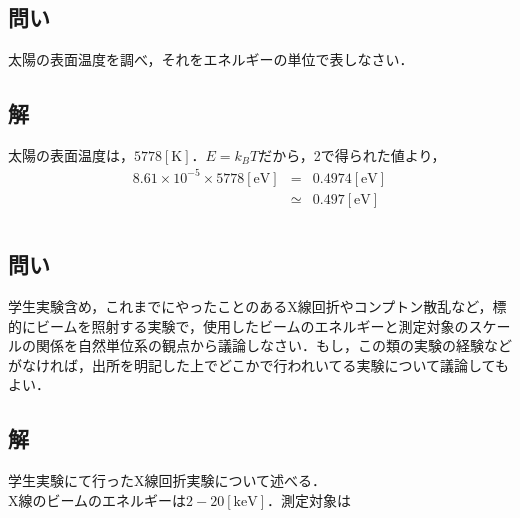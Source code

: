 \documentclass[10pt]{ujarticle}
\begin{document}
\section{}
\subsection{問い}
太陽の表面温度を調べ，それをエネルギーの単位で表しなさい．

\subsection{解}
太陽の表面温度は，$5778\mathrm{[K]}$．$E = k_B T$だから，2で得られた値より，
\begin{eqnarray*}
8.61 \times 10^{-5} \times 5778 \mathrm{[eV]} &=& 0.4974 \mathrm{[eV]} \\
&\simeq& 0.497 \mathrm{[eV]}
\end{eqnarray*}

\section{}
\subsection{問い}
学生実験含め，これまでにやったことのあるX線回折やコンプトン散乱など，標的にビームを照射する実験で，使用したビームのエネルギーと測定対象のスケールの関係を自然単位系の観点から議論しなさい．もし，この類の実験の経験などがなければ，出所を明記した上でどこかで行われいてる実験について議論してもよい．

\subsection{解}
学生実験にて行ったX線回折実験について述べる．\\
X線のビームのエネルギーは$2-20\mathrm{[keV]}$．測定対象は
\end{document}

